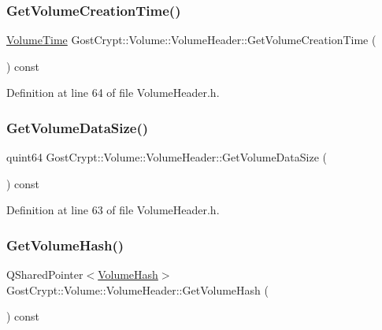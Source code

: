\subsubsection{\texorpdfstring{Get\+Volume\+Creation\+Time()}{GetVolumeCreationTime()}}
{\footnotesize\ttfamily \hyperlink{namespace_gost_crypt_1_1_volume_a4aab8aad1263f3abd1e4949b1e428468}{Volume\+Time} Gost\+Crypt\+::\+Volume\+::\+Volume\+Header\+::\+Get\+Volume\+Creation\+Time (\begin{DoxyParamCaption}{ }\end{DoxyParamCaption}) const\hspace{0.3cm}{\ttfamily [inline]}}



Definition at line 64 of file Volume\+Header.\+h.

\mbox{\label{class_gost_crypt_1_1_volume_1_1_volume_header_afe9b400a865f65e6067a23927842ae7d}} 
\subsubsection{\texorpdfstring{Get\+Volume\+Data\+Size()}{GetVolumeDataSize()}}
{\footnotesize\ttfamily quint64 Gost\+Crypt\+::\+Volume\+::\+Volume\+Header\+::\+Get\+Volume\+Data\+Size (\begin{DoxyParamCaption}{ }\end{DoxyParamCaption}) const\hspace{0.3cm}{\ttfamily [inline]}}



Definition at line 63 of file Volume\+Header.\+h.

\mbox{\label{class_gost_crypt_1_1_volume_1_1_volume_header_a1fb49b0a5cd673cbd0da51c4d5c9f4ff}} 
\subsubsection{\texorpdfstring{Get\+Volume\+Hash()}{GetVolumeHash()}}
{\footnotesize\ttfamily Q\+Shared\+Pointer$<$\hyperlink{class_gost_crypt_1_1_volume_1_1_volume_hash}{Volume\+Hash}$>$ Gost\+Crypt\+::\+Volume\+::\+Volume\+Header\+::\+Get\+Volume\+Hash (\begin{DoxyParamCaption}{ }\end{DoxyParamCaption}) const\hspace{0.3cm}{\ttfamily [inline]}}



